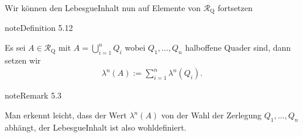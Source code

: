 \documentclass[letterpaper,10pt,german]{jupyterBook}
\begin{document}
\sphinxAtStartPar
Wir können den Lebesgue\sphinxhyphen{}Inhalt nun auf Elemente von \(\mathcal{R}_{\text{Q}}\) fortsetzen
\label{masstheorie/masstheorie:definition-20}
\begin{sphinxadmonition}{note}{Definition 5.12}



\sphinxAtStartPar
Es sei \(A\in\mathcal{R}_{\text{Q}}\) mit \(A=\bigcup_{i=1}^n Q_i\) wobei \(Q_1,\ldots,Q_n\)  halboffene Quader sind, dann setzen wir
\begin{equation*}
\begin{split}\lambda^n(A):=\sum_{i=1}^{n} \lambda^n(Q_i).\end{split}
\end{equation*}\end{sphinxadmonition}
\label{masstheorie/masstheorie:remark-21}
\begin{sphinxadmonition}{note}{Remark 5.3}



\sphinxAtStartPar
Man erkennt leicht, dass der Wert \(\lambda^n(A)\)  von der Wahl der Zerlegung \(Q_1,\ldots,Q_n\) abhängt, der Lebesgue\sphinxhyphen{}Inhalt ist also wohldefiniert.
\end{sphinxadmonition}
\end{document}
